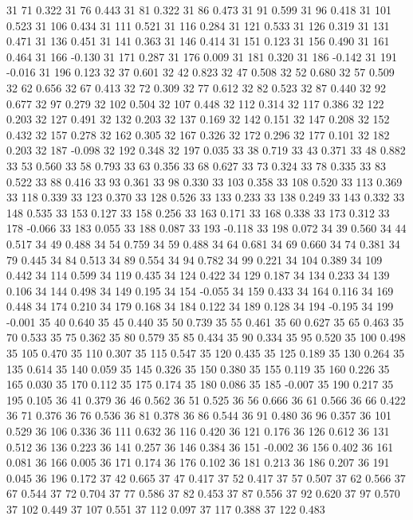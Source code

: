 31 71 0.322
31 76 0.443
31 81 0.322
31 86 0.473
31 91 0.599
31 96 0.418
31 101 0.523
31 106 0.434
31 111 0.521
31 116 0.284
31 121 0.533
31 126 0.319
31 131 0.471
31 136 0.451
31 141 0.363
31 146 0.414
31 151 0.123
31 156 0.490
31 161 0.464
31 166 -0.130
31 171 0.287
31 176 0.009
31 181 0.320
31 186 -0.142
31 191 -0.016
31 196 0.123
32 37 0.601
32 42 0.823
32 47 0.508
32 52 0.680
32 57 0.509
32 62 0.656
32 67 0.413
32 72 0.309
32 77 0.612
32 82 0.523
32 87 0.440
32 92 0.677
32 97 0.279
32 102 0.504
32 107 0.448
32 112 0.314
32 117 0.386
32 122 0.203
32 127 0.491
32 132 0.203
32 137 0.169
32 142 0.151
32 147 0.208
32 152 0.432
32 157 0.278
32 162 0.305
32 167 0.326
32 172 0.296
32 177 0.101
32 182 0.203
32 187 -0.098
32 192 0.348
32 197 0.035
33 38 0.719
33 43 0.371
33 48 0.882
33 53 0.560
33 58 0.793
33 63 0.356
33 68 0.627
33 73 0.324
33 78 0.335
33 83 0.522
33 88 0.416
33 93 0.361
33 98 0.330
33 103 0.358
33 108 0.520
33 113 0.369
33 118 0.339
33 123 0.370
33 128 0.526
33 133 0.233
33 138 0.249
33 143 0.332
33 148 0.535
33 153 0.127
33 158 0.256
33 163 0.171
33 168 0.338
33 173 0.312
33 178 -0.066
33 183 0.055
33 188 0.087
33 193 -0.118
33 198 0.072
34 39 0.560
34 44 0.517
34 49 0.488
34 54 0.759
34 59 0.488
34 64 0.681
34 69 0.660
34 74 0.381
34 79 0.445
34 84 0.513
34 89 0.554
34 94 0.782
34 99 0.221
34 104 0.389
34 109 0.442
34 114 0.599
34 119 0.435
34 124 0.422
34 129 0.187
34 134 0.233
34 139 0.106
34 144 0.498
34 149 0.195
34 154 -0.055
34 159 0.433
34 164 0.116
34 169 0.448
34 174 0.210
34 179 0.168
34 184 0.122
34 189 0.128
34 194 -0.195
34 199 -0.001
35 40 0.640
35 45 0.440
35 50 0.739
35 55 0.461
35 60 0.627
35 65 0.463
35 70 0.533
35 75 0.362
35 80 0.579
35 85 0.434
35 90 0.334
35 95 0.520
35 100 0.498
35 105 0.470
35 110 0.307
35 115 0.547
35 120 0.435
35 125 0.189
35 130 0.264
35 135 0.614
35 140 0.059
35 145 0.326
35 150 0.380
35 155 0.119
35 160 0.226
35 165 0.030
35 170 0.112
35 175 0.174
35 180 0.086
35 185 -0.007
35 190 0.217
35 195 0.105
36 41 0.379
36 46 0.562
36 51 0.525
36 56 0.666
36 61 0.566
36 66 0.422
36 71 0.376
36 76 0.536
36 81 0.378
36 86 0.544
36 91 0.480
36 96 0.357
36 101 0.529
36 106 0.336
36 111 0.632
36 116 0.420
36 121 0.176
36 126 0.612
36 131 0.512
36 136 0.223
36 141 0.257
36 146 0.384
36 151 -0.002
36 156 0.402
36 161 0.081
36 166 0.005
36 171 0.174
36 176 0.102
36 181 0.213
36 186 0.207
36 191 0.045
36 196 0.172
37 42 0.665
37 47 0.417
37 52 0.417
37 57 0.507
37 62 0.566
37 67 0.544
37 72 0.704
37 77 0.586
37 82 0.453
37 87 0.556
37 92 0.620
37 97 0.570
37 102 0.449
37 107 0.551
37 112 0.097
37 117 0.388
37 122 0.483
